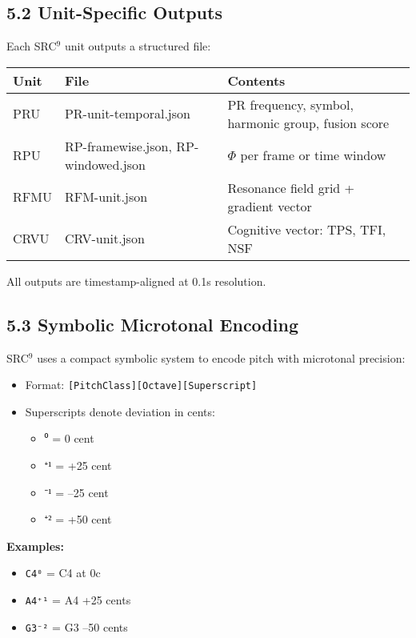 \subsection*{5.2 Unit-Specific Outputs}

Each SRC$^{9}$ unit outputs a structured file:

\begin{center}
\begin{tabular}{|l|l|l|}
\hline
\textbf{Unit} & \textbf{File} & \textbf{Contents} \\
\hline
PRU & PR-unit-temporal.json & PR frequency, symbol, harmonic group, fusion score \\
RPU & RP-framewise.json, RP-windowed.json & $\Phi$ per frame or time window \\
RFMU & RFM-unit.json & Resonance field grid + gradient vector \\
CRVU & CRV-unit.json & Cognitive vector: TPS, TFI, NSF \\
\hline
\end{tabular}
\end{center}

All outputs are timestamp-aligned at 0.1s resolution.

\subsection*{5.3 Symbolic Microtonal Encoding}

SRC$^{9}$ uses a compact symbolic system to encode pitch with microtonal precision:

\begin{itemize}
    \item Format: \texttt{[PitchClass][Octave][Superscript]}
    \item Superscripts denote deviation in cents:
    \begin{itemize}
        \item $⁰$ = 0 cent
        \item $⁺¹$ = +25 cent
        \item $⁻¹$ = –25 cent
        \item $⁺²$ = +50 cent
    \end{itemize}
\end{itemize}

\textbf{Examples:}

\begin{itemize}
    \item \texttt{C4⁰} = C4 at 0c
    \item \texttt{A4⁺¹} = A4 +25 cents
    \item \texttt{G3⁻²} = G3 –50 cents
\end{itemize}

